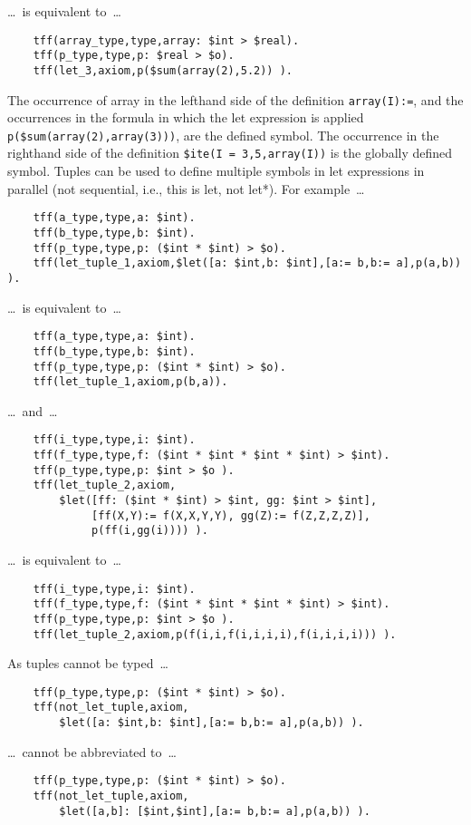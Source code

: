 \documentclass{easychair}
\begin{document}
\ldots~is equivalent to~\ldots
\begin{verbatim}
    tff(array_type,type,array: $int > $real).
    tff(p_type,type,p: $real > $o).
    tff(let_3,axiom,p($sum(array(2),5.2)) ).
\end{verbatim}
The occurrence of array in the lefthand side of the definition 
{\tt array(I):=}, and the occurrences in the formula in which the let 
expression is applied {\tt p(\$sum(array(2),array(3)))}, are the defined 
symbol. 
The occurrence in the righthand side of the definition 
{\tt \$ite(I = 3,5,array(I))} is the globally defined symbol.
Tuples can be used to define multiple symbols in let expressions in parallel 
(not sequential, i.e., this is let, not let*). 
For example~\ldots
\begin{verbatim}
    tff(a_type,type,a: $int).
    tff(b_type,type,b: $int).
    tff(p_type,type,p: ($int * $int) > $o).
    tff(let_tuple_1,axiom,$let([a: $int,b: $int],[a:= b,b:= a],p(a,b)) ).
\end{verbatim}
\ldots~is equivalent to~\ldots
\begin{verbatim}
    tff(a_type,type,a: $int).
    tff(b_type,type,b: $int).
    tff(p_type,type,p: ($int * $int) > $o).
    tff(let_tuple_1,axiom,p(b,a)).
\end{verbatim}
\ldots~and~\ldots
\begin{verbatim}
    tff(i_type,type,i: $int).
    tff(f_type,type,f: ($int * $int * $int * $int) > $int).
    tff(p_type,type,p: $int > $o ).
    tff(let_tuple_2,axiom,
        $let([ff: ($int * $int) > $int, gg: $int > $int],
             [ff(X,Y):= f(X,X,Y,Y), gg(Z):= f(Z,Z,Z,Z)],
             p(ff(i,gg(i)))) ).
\end{verbatim}
\ldots~is equivalent to~\ldots
\begin{verbatim}
    tff(i_type,type,i: $int).
    tff(f_type,type,f: ($int * $int * $int * $int) > $int).
    tff(p_type,type,p: $int > $o ).
    tff(let_tuple_2,axiom,p(f(i,i,f(i,i,i,i),f(i,i,i,i))) ).
\end{verbatim}
As tuples cannot be typed~\ldots
\begin{verbatim}
    tff(p_type,type,p: ($int * $int) > $o).
    tff(not_let_tuple,axiom,
        $let([a: $int,b: $int],[a:= b,b:= a],p(a,b)) ).
\end{verbatim}
\ldots~cannot be abbreviated to~\ldots
\begin{verbatim}
    tff(p_type,type,p: ($int * $int) > $o).
    tff(not_let_tuple,axiom,
        $let([a,b]: [$int,$int],[a:= b,b:= a],p(a,b)) ).
\end{verbatim}
\end{document}
